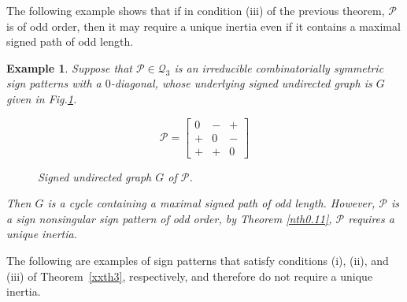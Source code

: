 \documentclass[10pt,a4paper]{amsart}
\newtheorem{eg}{Example}[section]
\numberwithin{equation}{section}
\begin{document}
The following example shows that if in condition (iii) of the previous theorem, $\mathcal{P}$ is of odd order, then it may require a unique inertia even if it contains a maximal signed path of odd length.

\begin{eg}\label{xeg1} Suppose that $\mathcal{P}\in \mathcal{Q}_3$ is an irreducible combinatorially symmetric sign patterns with a $0$-diagonal, whose underlying signed undirected graph is $G$ given in Fig.\ref{xfign1.9}.
	\begin{figure}[H]
		\centering
		\begin{minipage}{.45\textwidth}
			\vspace{-1cm}
			\[
			\mathcal{P}=
			\begin{bmatrix}
				0 & - & + \\
				+ & 0 & - \\
				+ & + & 0
			\end{bmatrix}
			\]
		\end{minipage}
		\hspace{0.05\textwidth}
		\begin{minipage}{.45\textwidth}
			\centering
			\tikzset{node distance=1cm}
			\caption{Signed undirected graph $ G$ of $\mathcal{P}$.}
			\label{xfign1.9}
		\end{minipage}
	\end{figure}
	
	Then $G$ is a cycle containing a maximal signed path of odd length. However, $\mathcal{P}$ is a sign nonsingular sign pattern of odd order, by Theorem \ref{nth0.11}, $\mathcal{P}$ requires a unique inertia.
\end{eg}




The following are examples of sign patterns that satisfy conditions (i), (ii), and (iii) of Theorem~\ref{xxth3}, respectively, and therefore do not require a unique inertia.
\end{document}
